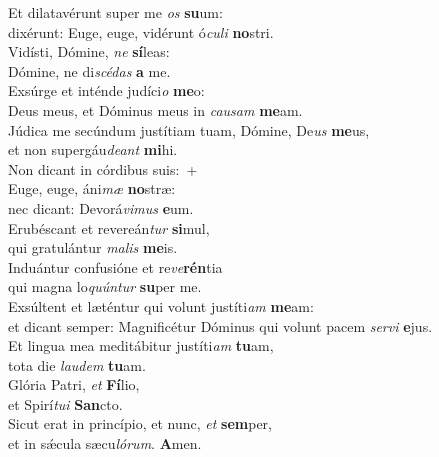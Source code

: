 \evenverse Et dilatavérunt super me \textit{os} \textbf{su}um:~\*\\
\evenverse dixérunt: Euge, euge, vidérunt ó\textit{cu}\textit{li} \textbf{no}stri.\\
\oddverse Vidísti, Dómine, \textit{ne} \textbf{sí}leas:~\*\\
\oddverse Dómine, ne di\textit{scé}\textit{das} \textbf{a} me.\\
\evenverse Exsúrge et inténde judíci\textit{o} \textbf{me}o:~\*\\
\evenverse Deus meus, et Dóminus meus in \textit{cau}\textit{sam} \textbf{me}am.\\
\oddverse Júdica me secúndum justítiam tuam, Dómine, De\textit{us} \textbf{me}us,~\*\\
\oddverse et non supergáu\textit{de}\textit{ant} \textbf{mi}hi.\\
\evenverse Non dicant in córdibus suis:~+\\
\evenverse  Euge, euge, áni\textit{mæ} \textbf{no}stræ:~\*\\
\evenverse nec dicant: Devorá\textit{vi}\textit{mus} \textbf{e}um.\\
\oddverse Erubéscant et revereán\textit{tur} \textbf{si}mul,~\*\\
\oddverse qui gratulántur \textit{ma}\textit{lis} \textbf{me}is.\\
\evenverse Induántur confusióne et re\textit{ve}\textbf{rén}tia~\*\\
\evenverse qui magna lo\textit{quún}\textit{tur} \textbf{su}per me.\\
\oddverse Exsúltent et læténtur qui volunt justíti\textit{am} \textbf{me}am:~\*\\
\oddverse et dicant semper: Magnificétur Dóminus qui volunt pacem \textit{ser}\textit{vi} \textbf{e}jus.\\
\evenverse Et lingua mea meditábitur justíti\textit{am} \textbf{tu}am,~\*\\
\evenverse tota die \textit{lau}\textit{dem} \textbf{tu}am.\\
\oddverse Glória Patri, \textit{et} \textbf{Fí}lio,~\*\\
\oddverse et Spirí\textit{tu}\textit{i} \textbf{San}cto.\\
\evenverse Sicut erat in princípio, et nunc, \textit{et} \textbf{sem}per,~\*\\
\evenverse et in sǽcula sæcu\textit{ló}\textit{rum}. \textbf{A}men.\\
